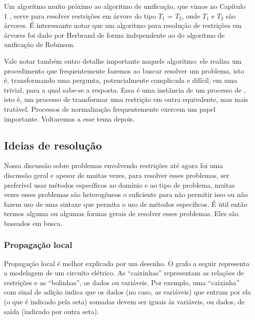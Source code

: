 \documentclass{article}
\begin{document}
Um algoritmo muito próximo ao algoritmo de unificação, que vimos no Capítulo 1 %
, serve para resolver restrições em árvore do tipo $T_1$ = $T_2$, onde $T_1$ e $T_2$ são árvores. É interessante notar que um algoritmo para resolução de restrições em árvores foi dado por Herbrand\cite{herbrand} de forma independente ao do algoritmo de unificação de Robinson.

Vale notar também outro detalhe importante naquele algoritmo: ele realiza um procedimento que frequentemente fazemos ao buscar resolver um problema, isto é, transformando uma pergunta, potencialmente complicada e difícil, em uma trivial, para a qual sabe-se a resposta. Essa é uma instância de um processo de , isto é, um processo de transformar uma restrição em outra equivalente, mas mais tratável. Processos de normalização frequentemente
exercem um papel importante. Voltaremos a esse tema depois.

\subsection{Ideias de resolução}

Nossa discussão sobre problemas envolvendo restrições até agora foi uma discussão geral e apesar de
muitas vezes, para resolver esses problemas, ser preferível usar métodos específicos ao domínio e ao
tipo de problema, muitas vezes esses problemas são heterogêneos o suficiente para não permitir isso
ou não fazem uso de uma sintaxe que permita o uso de métodos específicos.
É útil então termos alguma ou algumas formas gerais de resolver esses problemas. Eles são baseados em busca.

\subsubsection{Propagação local}

Propagação local é melhor explicada por um desenho. O grafo a seguir representa a modelagem de um
circuito elétrico.
As ``caixinhas'' representam as relações de restrições e as ``bolinhas'', os dados ou variáveis. Por
exemplo, uma ``caixinha'' com sinal de adição indica que os dados (no caso, as variáveis) que entram
por ela (o que é indicado pela seta) somadas devem ser iguais às variáveis, ou dados, de saída
(indicado por outra seta).
\end{document}
